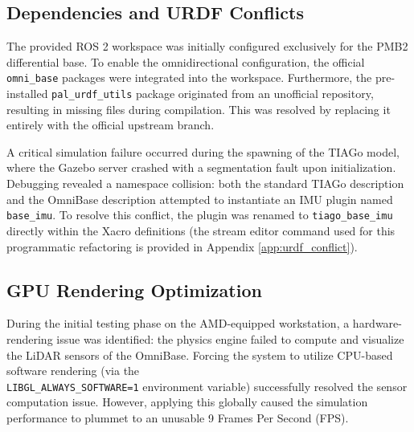 \subsection{Dependencies and URDF Conflicts}
The provided ROS 2 workspace was initially configured exclusively for the PMB2 differential base. To enable the omnidirectional configuration, the official \texttt{omni\_base} packages were integrated into the workspace. Furthermore, the pre-installed \texttt{pal\_urdf\_utils} package originated from an unofficial repository, resulting in missing files during compilation. This was resolved by replacing it entirely with the official upstream branch.

A critical simulation failure occurred during the spawning of the TIAGo model, where the Gazebo server crashed with a segmentation fault upon initialization. Debugging revealed a namespace collision: both the standard TIAGo description and the OmniBase description attempted to instantiate an IMU plugin named \texttt{base\_imu}. To resolve this conflict, the plugin was renamed to \texttt{tiago\_base\_imu} directly within the Xacro definitions (the stream editor command used for this programmatic refactoring is provided in Appendix \ref{app:urdf_conflict}).

\subsection{GPU Rendering Optimization}
\label{subsec:gpu optimization}
During the initial testing phase on the AMD-equipped workstation, a hardware-rendering issue was identified: the physics engine failed to compute and visualize the LiDAR sensors of the OmniBase. Forcing the system to utilize CPU-based software rendering (via the \\ \texttt{LIBGL\_ALWAYS\_SOFTWARE=1} environment variable) successfully resolved the sensor computation issue. However, applying this globally caused the simulation performance to plummet to an unusable 9 Frames Per Second (FPS).

